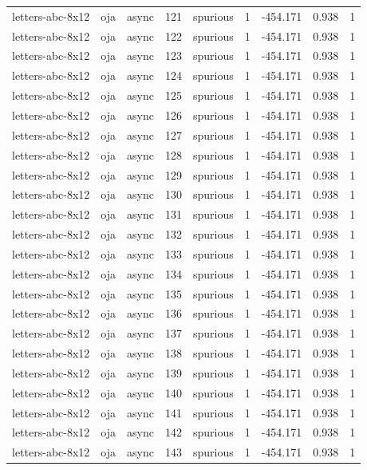 \begin{tabular}{lllrlrrrr}
letters-abc-8x12 & oja & async & 121 & spurious & 1 & -454.171 & 0.938 & 1 \\
letters-abc-8x12 & oja & async & 122 & spurious & 1 & -454.171 & 0.938 & 1 \\
letters-abc-8x12 & oja & async & 123 & spurious & 1 & -454.171 & 0.938 & 1 \\
letters-abc-8x12 & oja & async & 124 & spurious & 1 & -454.171 & 0.938 & 1 \\
letters-abc-8x12 & oja & async & 125 & spurious & 1 & -454.171 & 0.938 & 1 \\
letters-abc-8x12 & oja & async & 126 & spurious & 1 & -454.171 & 0.938 & 1 \\
letters-abc-8x12 & oja & async & 127 & spurious & 1 & -454.171 & 0.938 & 1 \\
letters-abc-8x12 & oja & async & 128 & spurious & 1 & -454.171 & 0.938 & 1 \\
letters-abc-8x12 & oja & async & 129 & spurious & 1 & -454.171 & 0.938 & 1 \\
letters-abc-8x12 & oja & async & 130 & spurious & 1 & -454.171 & 0.938 & 1 \\
letters-abc-8x12 & oja & async & 131 & spurious & 1 & -454.171 & 0.938 & 1 \\
letters-abc-8x12 & oja & async & 132 & spurious & 1 & -454.171 & 0.938 & 1 \\
letters-abc-8x12 & oja & async & 133 & spurious & 1 & -454.171 & 0.938 & 1 \\
letters-abc-8x12 & oja & async & 134 & spurious & 1 & -454.171 & 0.938 & 1 \\
letters-abc-8x12 & oja & async & 135 & spurious & 1 & -454.171 & 0.938 & 1 \\
letters-abc-8x12 & oja & async & 136 & spurious & 1 & -454.171 & 0.938 & 1 \\
letters-abc-8x12 & oja & async & 137 & spurious & 1 & -454.171 & 0.938 & 1 \\
letters-abc-8x12 & oja & async & 138 & spurious & 1 & -454.171 & 0.938 & 1 \\
letters-abc-8x12 & oja & async & 139 & spurious & 1 & -454.171 & 0.938 & 1 \\
letters-abc-8x12 & oja & async & 140 & spurious & 1 & -454.171 & 0.938 & 1 \\
letters-abc-8x12 & oja & async & 141 & spurious & 1 & -454.171 & 0.938 & 1 \\
letters-abc-8x12 & oja & async & 142 & spurious & 1 & -454.171 & 0.938 & 1 \\
letters-abc-8x12 & oja & async & 143 & spurious & 1 & -454.171 & 0.938 & 1 \\

\end{tabular}
